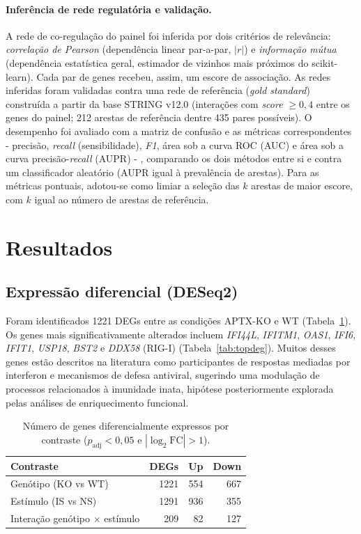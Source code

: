 \documentclass[10pt,letterpaper]{article}
\newcommand{\gene}[1]{\textit{#1}}
\newcommand{\logfc}{\ensuremath{\log_2\mathrm{FC}}}
\begin{document}
\paragraph{Inferência de rede regulatória e validação.} A rede de co-regulação
do painel foi inferida por dois critérios de relevância:
\emph{correlação de Pearson} (dependência linear par-a-par, \(|r|\)) e
\emph{informação mútua} (dependência estatística geral, estimador de vizinhos
mais próximos do \textsf{scikit-learn}). Cada par de genes recebeu, assim, um
escore de associação. As redes inferidas foram validadas contra uma rede de
referência (\emph{gold standard}) construída a partir da base STRING v12.0
(interações com \emph{score} \(\geq 0{,}4\) entre os genes do painel; 212
arestas de referência dentre 435 pares possíveis). O desempenho foi avaliado com
a matriz de confusão e as métricas correspondentes - precisão, \emph{recall}
(sensibilidade), \emph{F1}, área sob a curva ROC (AUC) e área sob a curva
precisão-\emph{recall} (AUPR) - , comparando os dois métodos entre si e contra
um classificador aleatório (AUPR igual à prevalência de arestas). Para as
métricas pontuais, adotou-se como limiar a seleção das \(k\) arestas de maior
escore, com \(k\) igual ao número de arestas de referência.

\section*{Resultados}

\subsection*{Expressão diferencial (DESeq2)}

Foram identificados \num{1221} DEGs entre as condições APTX-KO e WT
(Tabela~\ref{tab:deg}). Os genes mais significativamente alterados incluem
\gene{IFI44L}, \gene{IFITM1}, \gene{OAS1}, \gene{IFI6}, \gene{IFIT1},
\gene{USP18}, \gene{BST2} e \gene{DDX58} (RIG-I) (Tabela~\ref{tab:topdeg}).
Muitos desses genes estão descritos na literatura como participantes de
respostas mediadas por interferon e mecanismos de defesa antiviral, sugerindo
uma modulação de processos relacionados à imunidade inata, hipótese
posteriormente explorada pelas análises de enriquecimento funcional.

\begin{table}[htbp]
\centering
\caption{Número de genes diferencialmente expressos por contraste
(\(p_{\mathrm{adj}} < 0{,}05\) e \(|\logfc{}| > 1\)).}
\label{tab:deg}
\begin{tabular}{lrrr}
\toprule
\textbf{Contraste} & \textbf{DEGs} & \textbf{Up} & \textbf{Down} \\
\midrule
Genótipo (KO vs WT)            & \num{1221} & 554 & 667 \\
Estímulo (IS vs NS)            & \num{1291} & 936 & 355 \\
Interação genótipo \(\times\) estímulo & 209 & 82 & 127 \\
\bottomrule
\end{tabular}
\end{table}
\end{document}
